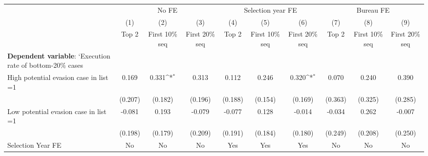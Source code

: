 {
\def\sym#1{\ifmmode^{#1}\else\(^{#1}\)\fi}
\begin{tabular}{l*{9}{c}}
\toprule
            &\multicolumn{3}{c}{No FE}                                        &\multicolumn{3}{c}{Selection year FE}                            &\multicolumn{3}{c}{Bureau FE}                                    \\\cmidrule(lr){2-4}\cmidrule(lr){5-7}\cmidrule(lr){8-10}
            &\multicolumn{1}{c}{(1)}&\multicolumn{1}{c}{(2)}&\multicolumn{1}{c}{(3)}&\multicolumn{1}{c}{(4)}&\multicolumn{1}{c}{(5)}&\multicolumn{1}{c}{(6)}&\multicolumn{1}{c}{(7)}&\multicolumn{1}{c}{(8)}&\multicolumn{1}{c}{(9)}\\
            &\multicolumn{1}{c}{Top 2}&\multicolumn{1}{c}{First 10\% seq}&\multicolumn{1}{c}{First 20\% seq}&\multicolumn{1}{c}{Top 2}&\multicolumn{1}{c}{First 10\% seq}&\multicolumn{1}{c}{First 20\% seq}&\multicolumn{1}{c}{Top 2}&\multicolumn{1}{c}{First 10\% seq}&\multicolumn{1}{c}{First 20\% seq}\\
\midrule
\textbf{Dependent variable}: `Execution rate of bottom-20\% cases&                     &                     &                     &                     &                     &                     &                     &                     &                     \\
\addlinespace
High potential evasion case in list =1&       0.169         &       0.331\sym{*}  &       0.313         &       0.112         &       0.246         &       0.320\sym{*}  &       0.070         &       0.240         &       0.390         \\
            &     (0.207)         &     (0.182)         &     (0.196)         &     (0.188)         &     (0.154)         &     (0.169)         &     (0.363)         &     (0.325)         &     (0.285)         \\
\addlinespace
Low potential evasion case in list =1&      -0.081         &       0.193         &      -0.079         &      -0.077         &       0.128         &      -0.014         &      -0.034         &       0.262         &      -0.007         \\
            &     (0.198)         &     (0.179)         &     (0.209)         &     (0.191)         &     (0.184)         &     (0.180)         &     (0.249)         &     (0.208)         &     (0.250)         \\
\midrule
Selection Year FE&          No         &          No         &          No         &         Yes         &         Yes         &         Yes         &          No         &          No         &          No         \\

\end{tabular}}
